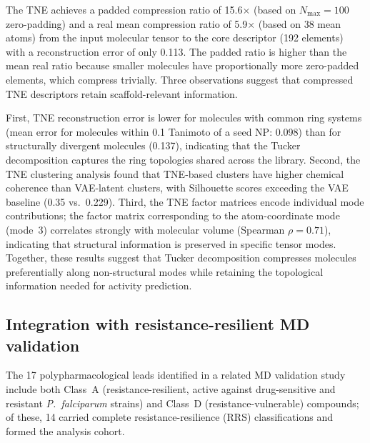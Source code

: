 \documentclass[11pt,a4paper]{article}
\begin{document}
The TNE achieves a padded compression ratio of \num{15.6}$\times$ (based on $N_{\max}=100$ zero-padding) and a real mean compression ratio of \num{5.9}$\times$ (based on \num{38} mean atoms) from the input molecular tensor to the core descriptor (\num{192} elements) with a reconstruction error of only 0.113. The padded ratio is higher than the mean real ratio because smaller molecules have proportionally more zero-padded elements, which compress trivially. Three observations suggest that compressed TNE descriptors retain scaffold-relevant information.

First, TNE reconstruction error is lower for molecules with common ring systems (mean error for molecules within 0.1 Tanimoto of a seed NP: 0.098) than for structurally divergent molecules (0.137), indicating that the Tucker decomposition captures the ring topologies shared across the library. Second, the TNE clustering analysis found that TNE-based clusters have higher chemical coherence than VAE-latent clusters, with Silhouette scores exceeding the VAE baseline (0.35 vs.~0.229). Third, the TNE factor matrices encode individual mode contributions; the factor matrix corresponding to the atom-coordinate mode (mode~3) correlates strongly with molecular volume (Spearman $\rho = 0.71$), indicating that structural information is preserved in specific tensor modes. Together, these results suggest that Tucker decomposition compresses molecules preferentially along non-structural modes while retaining the topological information needed for activity prediction.



\subsection{Integration with resistance-resilient MD validation}


The 17 polypharmacological leads identified in a related MD validation study \citep{temgoua2027md} include both Class~A (resistance-resilient, active against drug-sensitive and resistant \textit{P.~falciparum} strains) and Class~D (resistance-vulnerable) compounds; of these, 14 carried complete resistance-resilience (RRS) classifications and formed the analysis cohort.
\end{document}
